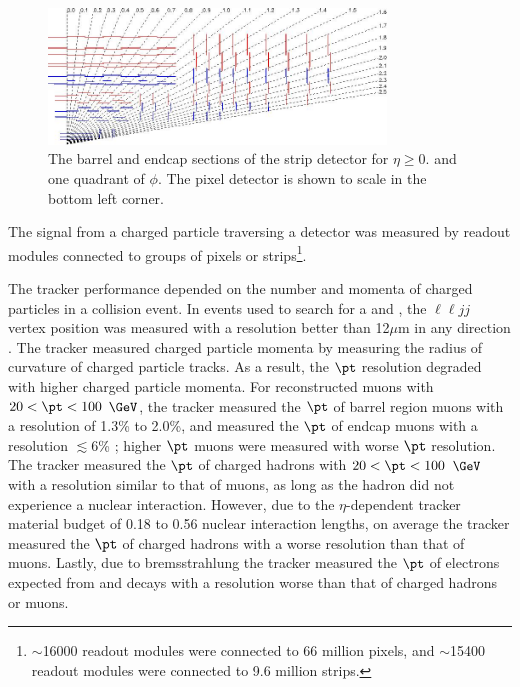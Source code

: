 \begin{figure}[ht]
	\centering
	\includegraphics[width=0.8\textwidth]{figures/siliconStripAndPixelDetectorTwoDimView.png}
	\caption{The barrel and endcap sections of the strip detector for $\eta \geq 0.$ and one quadrant of $\phi$.  
	The pixel detector is shown to scale in the bottom left corner.}
	\label{fig:stripTracker}
\end{figure}

The signal from a charged particle traversing a detector was measured by readout modules connected to groups of pixels or 
strips\footnote{$\sim$16000 readout modules were connected to 66 million pixels, and $\sim$15400 readout modules were connected 
to 9.6 million strips.}.

The tracker performance depended on the number and momenta of charged particles in a collision event.  In events used to search 
for a \WR and \nul, the $\ell\ell jj$ vertex position was measured with 
a resolution better than 12$\mu$m in any direction \cite{trackerPerformanceInCollisions}.  
The tracker measured charged particle momenta by measuring the radius of curvature of charged particle tracks.  As a result, 
the $\pt$ resolution degraded with higher charged particle momenta.  For reconstructed muons with $20 < \pt < 100$ $\GeV$, the 
tracker measured the $\pt$ of barrel region muons with a resolution of 1.3\% to 2.0\%, and measured the $\pt$ of endcap muons 
with a resolution $\lesssim$6\% \cite{muonRecoFirstCollisions}; higher $\pt$ muons were measured with worse $\pt$ resolution.  
The tracker measured the $\pt$ of charged hadrons with $20 < \pt < 100$ $\GeV$ with a resolution similar to that of muons, as 
long as the hadron did not experience a nuclear interaction. However, due to the $\eta$-dependent tracker 
material budget of 0.18 to 0.56 nuclear interaction lengths, on average the tracker measured the 
$\pt$ of charged hadrons with a worse resolution than that of muons.  Lastly, due to bremsstrahlung the tracker measured the 
$\pt$ of electrons expected from \WR and \nul decays with a resolution worse than that of charged hadrons or muons.

